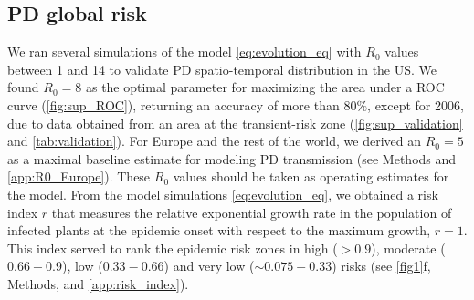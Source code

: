     \subsection{PD global risk}
    We ran several simulations of the model \cref{eq:evolution_eq} with $R_0$
    values between 1 and 14 to validate PD spatio-temporal distribution in the
    US. We found $R_0=8$ as the optimal parameter for maximizing the area under
    a ROC curve (\cref{fig:sup_ROC}), returning an accuracy of more than
$80\%$, except for 2006, due to data obtained from an area at the
    transient-risk zone (\cref{fig:sup_validation} and \cref{tab:validation}).
    For Europe and the rest of the world, we derived an $R_0=5$ as a maximal
    baseline estimate for modeling PD transmission (see Methods and
    \cref{app:R0_Europe}). These $R_0$ values should be taken as operating
    estimates for the model. From the model simulations \cref{eq:evolution_eq},
    we obtained a risk index $r$ that measures the relative exponential growth
    rate in the population of infected plants at the epidemic onset with
    respect to the maximum growth, $r=1$. This index served to rank the
    epidemic risk zones in high ($> 0.9$), moderate ($0.66-0.9$), low
    ($0.33-0.66$) and very low ($\sim 0.075-0.33$) risks (see \cref{fig1}f,
    Methods, and \cref{app:risk_index}).

    \begin{table}[H]
        \begin{center}
            \caption[Validation of model predictions]{\textbf{Validation of
                    model predictions.} The items are
                locations
                where PD was present or absent. TP corresponds to true
                positives and TN to true
                negatives according to our model with $R_0=8$. }
            \label{tab:validation}
        \end{center}
    \end{table}

